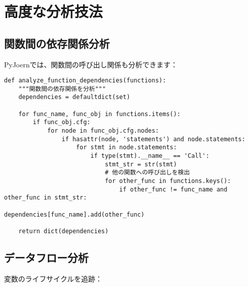 \documentclass[12pt,a4paper]{article}
\begin{document}
\section{高度な分析技法}

\subsection{関数間の依存関係分析}

PyJoernでは、関数間の呼び出し関係も分析できます：

\begin{lstlisting}[caption=関数間依存関係の分析]
def analyze_function_dependencies(functions):
    """関数間の依存関係を分析"""
    dependencies = defaultdict(set)

    for func_name, func_obj in functions.items():
        if func_obj.cfg:
            for node in func_obj.cfg.nodes:
                if hasattr(node, 'statements') and node.statements:
                    for stmt in node.statements:
                        if type(stmt).__name__ == 'Call':
                            stmt_str = str(stmt)
                            # 他の関数への呼び出しを検出
                            for other_func in functions.keys():
                                if other_func != func_name and other_func in stmt_str:
                                    dependencies[func_name].add(other_func)

    return dict(dependencies)
\end{lstlisting}

\subsection{データフロー分析}

変数のライフサイクルを追跡：
\end{document}
